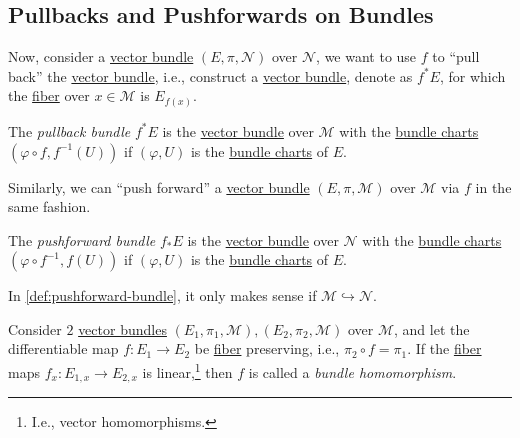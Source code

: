 \subsection{Pullbacks and Pushforwards on Bundles}
Now, consider a \hyperref[def:vector-bundle]{vector bundle} \((E, \pi , \mathcal{N} )\) over \(\mathcal{N} \), we want to use \(f\) to ``pull back'' the \hyperref[def:vector-bundle]{vector bundle}, i.e., construct a \hyperref[def:vector-bundle]{vector bundle}, denote as \(f^{\ast} E\), for which the \hyperref[def:fiber]{fiber} over \(x\in \mathcal{M} \) is \(E_{f(x)}\).

\begin{definition}\label{def:pullback-bundle}
	The \emph{pullback bundle} \(f^{\ast} E\) is the \hyperref[def:vector-bundle]{vector bundle} over \(\mathcal{M} \) with the \hyperref[def:bundle-chart]{bundle charts} \((\varphi \circ f, f^{-1} (U))\) if \((\varphi , U)\) is the \hyperref[def:bundle-chart]{bundle charts} of \(E\).
\end{definition}

Similarly, we can ``push forward'' a \hyperref[def:vector-bundle]{vector bundle} \((E, \pi , \mathcal{M} )\) over \(\mathcal{M} \) via \(f\) in the same fashion.

\begin{definition}\label{def:pushforward-bundle}
	The \emph{pushforward bundle} \(f_{\ast} E\) is the \hyperref[def:vector-bundle]{vector bundle} over \(\mathcal{N} \) with the \hyperref[def:bundle-chart]{bundle charts} \((\varphi \circ f^{-1} , f (U))\) if \((\varphi , U)\) is the \hyperref[def:bundle-chart]{bundle charts} of \(E\).
\end{definition}

\begin{note}
	In \autoref{def:pushforward-bundle}, it only makes sense if \(\mathcal{M} \hookrightarrow \mathcal{N} \).
\end{note}

\begin{definition}\label{def:bundle-homomorphism}
	Consider \(2\) \hyperref[def:vector-bundle]{vector bundles} \((E_1, \pi _1, \mathcal{M} ), (E_2, \pi _2, \mathcal{M} )\) over \(\mathcal{M} \), and let the differentiable map \(f\colon E_1 \to E_2\) be \hyperref[def:fiber]{fiber} preserving, i.e., \(\pi _2 \circ f = \pi _1\). If the \hyperref[def:fiber]{fiber} maps \(f_x \colon E_{1,x} \to E_{2,x}\) is linear,\footnote{I.e., vector homomorphisms.} then \(f\) is called a \emph{bundle homomorphism}.
\end{definition}

